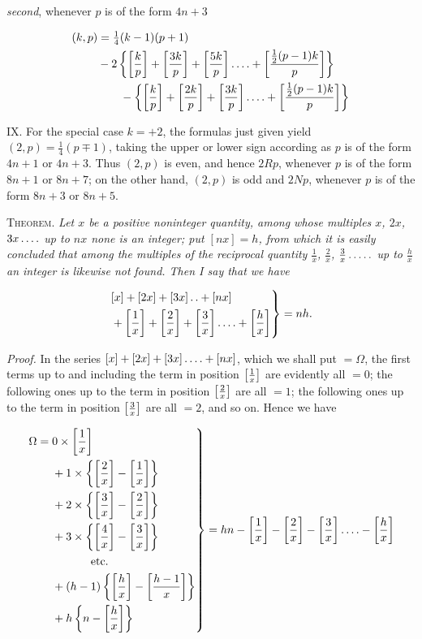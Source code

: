 \emph{second}, whenever $p$ is of the form $4n+3$

\[
\begin{aligned}
(k,p)&=\tfrac14(k-1)(p+1)\\
& -2\left\{\left[\frac{k}{p}\right]+\left[\frac{3k}{p}\right]+\left[\frac{5k}{p}\right]\mathinner{.\,.\,.\,.}+\left[\frac{\frac12(p-1)k}{p}\right]\right\}\\
&\qquad-\left\{\left[\frac{k}{p}\right]+\left[\frac{2k}{p}\right]+\left[\frac{3k}{p}\right]\mathinner{.\,.\,.\,.}+\left[\frac{\frac12(p-1)k}{p}\right]\right\}
\end{aligned}
\]

IX. For the special case $k=+2$, the formulas just given yield $(2,p)=\tfrac14(p\mp1)$, taking the upper or lower sign according as $p$ is of the form $4n+1$ or $4n+3$. Thus $(2,p)$ is even, and hence $2Rp$, whenever $p$ is of the form $8n+1$ or $8n+7$; on the other hand, $(2,p)$ is odd and $2Np$, whenever $p$ is of the form $8n+3$ or $8n+5$.


\textsc{Theorem.} \emph{Let $x$ be a positive noninteger quantity, among whose multiples $x$, $2x$,} \emph{$3x\mathinner{.\,.\,.\,.}$ up to $nx$ none is an integer; put $[nx]=h$, from which it is easily concluded} \emph{that among the multiples of the reciprocal quantity $\frac1x$, $\frac2x$, $\frac3x\mathinner{.\,.\,.\,.\,.}$ up to $\frac hx$ an integer is likewise not} \emph{found. Then I say that we have}

\[
\begin{aligned}
\left.\begin{aligned}
&[x]+[2x]+[3x]\mathinner{.\,.}+[nx]\\
&+\left[\frac1x\right]+\left[\frac2x\right]+\left[\frac3x\right]\mathinner{.\,.\,.\,.}+\left[\frac hx\right]
\end{aligned}\right\}=nh.
\end{aligned}
\]

\emph{Proof.} In the series $[x]+[2x]+[3x]\mathinner{.\,.\,.\,.}+[nx]$, which we shall put $=\Omega$, the first terms up to and including the term in position $\left[\frac1x\right]$ are evidently all $=0$; the following ones up to the term in position $\left[\frac2x\right]$ are all $=1$; the following ones up to the term in position $\left[\frac3x\right]$ are all $=2$, and so on. Hence we have

\[
\begin{aligned}
\left.\begin{aligned}
\Omega={}&0\times\gbr{\frac1x}\\
&+1\times\left\{\gbr{\frac2x}-\gbr{\frac1x}\right\}\\
&+2\times\left\{\gbr{\frac3x}-\gbr{\frac2x}\right\}\\
&+3\times\left\{\gbr{\frac4x}-\gbr{\frac3x}\right\}\\
&\hspace{12mm}\text{etc.}\\
&+(h-1)\left\{\gbr{\frac hx}-\gbr{\frac{h-1}{x}}\right\}\\
&+h\left\{n-\gbr{\frac hx}\right\}
\end{aligned}\right\}=hn-\gbr{\frac1x}-\gbr{\frac2x}-\gbr{\frac3x}\dotsfour-\gbr{\frac hx}
\end{aligned}
\]

